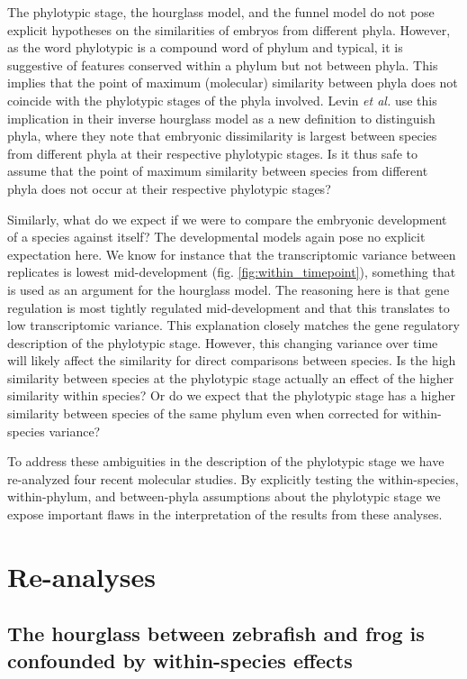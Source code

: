 The phylotypic stage, the hourglass model, and the funnel model do not pose explicit hypotheses on the similarities of embryos from different phyla. However, as the word phylotypic is a compound word of phylum and typical, it is suggestive of features conserved within a phylum but not between phyla. This implies that the point of maximum (molecular) similarity between phyla does not coincide with the phylotypic stages of the phyla involved. Levin \textit{et al.}\cite{Levin2016} use this implication in their inverse hourglass model as a new definition to distinguish phyla, where they note that embryonic dissimilarity is largest between species from different phyla at their respective phylotypic stages. Is it thus safe to assume that the point of maximum similarity between species from different phyla does not occur at their respective phylotypic stages? 

Similarly, what do we expect if we were to compare the embryonic development of a species against itself? The developmental models again pose no explicit expectation here. We know for instance that the transcriptomic variance between replicates is lowest mid-development (fig. \ref{fig:within_timepoint}), something that is used as an argument for the hourglass model\cite{Liu2020, Uchida2022}. The reasoning here is that gene regulation is most tightly regulated mid-development and that this translates to low transcriptomic variance. This explanation closely matches the gene regulatory description of the phylotypic stage. However, this changing variance over time will likely affect the similarity for direct comparisons between species. Is the high similarity between species at the phylotypic stage actually an effect of the higher similarity within species? Or do we expect that the phylotypic stage has a higher similarity between species of the same phylum even when corrected for within-species variance?

To address these ambiguities in the description of the phylotypic stage we have re-analyzed four recent molecular studies. By explicitly testing the within-species, within-phylum, and between-phyla assumptions about the phylotypic stage we expose important flaws in the interpretation of the results from these analyses.

\section{Re-analyses}

\subsection{The hourglass between zebrafish and frog is confounded by within-species effects} \label{subsection:marletaz}

